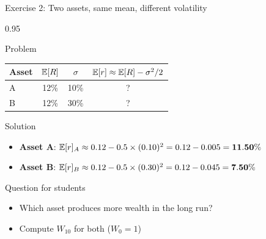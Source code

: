 \documentclass[9pt, aspectratio=169, t]{beamer}
\begin{document}
\begin{frame}[shrink=7]{Exercise 2: Two assets, same mean, different volatility}
    \begin{cminipage}{0.95\textwidth}
    \begin{block}{Problem}
    \begin{center}
    {\small
    \renewcommand{\arraystretch}{1.3}
    \begin{tabular}{lccc}
    \toprule
    \textbf{Asset} & $\mathbb{E}[R]$ & $\sigma$ & $\mathbb{E}[r] \approx \mathbb{E}[R] - \sigma^2/2$ \\
    \midrule
    A & 12\% & 10\% & ? \\
    B & 12\% & 30\% & ? \\
    \bottomrule
    \end{tabular}
    }
    \end{center}
    \end{block}
    \vspace{0.2cm}
    \begin{exampleblock}{Solution}
    \begin{itemize}\setlength{\itemsep}{0pt}
        \item \textbf{Asset A}: $\mathbb{E}[r]_A \approx 0.12 - 0.5 \times (0.10)^2 = 0.12 - 0.005 = \mathbf{11.50\%}$
        \item \textbf{Asset B}: $\mathbb{E}[r]_B \approx 0.12 - 0.5 \times (0.30)^2 = 0.12 - 0.045 = \mathbf{7.50\%}$
    \end{itemize}
    \end{exampleblock}
    \vspace{0.1cm}
    \begin{alertblock}{Question for students}
    \begin{itemize}\setlength{\itemsep}{0pt}
        \item Which asset produces more wealth in the long run?
        \item Compute $W_{10}$ for both ($W_0 = 1$)
    \end{itemize}
    \end{alertblock}
    \end{cminipage}
\end{frame}
\end{document}
